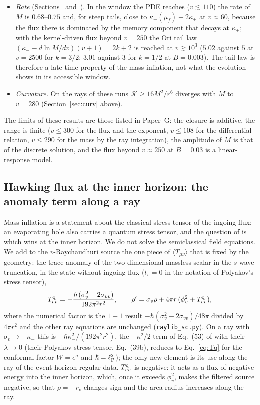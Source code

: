 \documentclass[11pt]{article}
\begin{document}
\begin{itemize}
\item \emph{Rate} (Sections~\Gkernelnum{} and~\Grayn{}). In the window the PDE reaches ($v\lesssim110$) the rate of $M$ is $0.68$--$0.75$ and, for steep tails, close to $\kappa_-(\mu_f)-2\kappa_+$ at $v\approx60$, because the flux there is dominated by the memory component that decays at $\kappa_+$; with the kernel-driven flux beyond $v=250$ the Ori tail law $(\kappa_--d\ln M/dv)(v+1)=2k+2$ is reached at $v\gtrsim10^{3}$ ($5.02$ against $5$ at $v=2500$ for $k=3/2$; $3.01$ against $3$ for $k=1/2$ at $B=0.003$). The tail law is therefore a late-time property of the mass inflation, not what the evolution shows in its accessible window.
\item \emph{Curvature.} On the rays of these runs $\mathcal K\ge16M^2/r^6$ diverges with $M$ to $v=280$ (Section~\ref{sec:curv} above).
\end{itemize}
The limits of these results are those listed in Paper~G: the closure is additive, the range is finite ($v\le300$ for the flux and the exponent, $v\le108$ for the differential relation, $v\le290$ for the mass by the ray integration), the amplitude of $M$ is that of the discrete solution, and the flux beyond $v\approx250$ at $B=0.03$ is a linear-response model.


\subsection{Hawking flux at the inner horizon: the anomaly term along a ray}
\label{sec:semiclassical}

Mass inflation is a statement about the classical stress tensor of the ingoing flux; an evaporating hole also carries a quantum stress tensor, and the question of \citet{Barcelo2022} is which wins at the inner horizon. We do not solve the semiclassical field equations. We add to the $v$-Raychaudhuri source the one piece of $\langle T_{\mu\nu}\rangle$ that is fixed by the geometry: the trace anomaly of the two-dimensional massless scalar in the $s$-wave truncation, in the state without ingoing flux ($t_v=0$ in the notation of Polyakov's stress tensor),
\begin{equation}
T^{\rm q}_{vv}=-\frac{\hbar\,(\sigma_v^2-2\sigma_{vv})}{192\pi^{2}r^{2}},\qquad
\rho'=\sigma_v\rho+4\pi r\,(\phi_v^2+T^{\rm q}_{vv}),
\label{eq:Tq}
\end{equation}
where the numerical factor is the $1{+}1$ result $-\hbar(\sigma_v^2-2\sigma_{vv})/48\pi$ divided by $4\pi r^2$ and the other ray equations are unchanged (\texttt{raylib\_sc.py}). On a ray with $\sigma_v\to-\kappa_-$ this is $-\hbar\kappa_-^2/(192\pi^2r^2)$, the $-\kappa^2/2$ term of Eq.~(53) of \citet{Barcelo2022} with their $\lambda\to0$ (their Polyakov stress tensor, Eq.~(39b), reduces to Eq.~\eqref{eq:Tq} for the conformal factor $W=e^\sigma$ and $\hbar=\ell_{\rm P}^2$); the only new element is its use along the ray of the event-horizon-regular data. $T^{\rm q}_{vv}$ is negative: it acts as a flux of negative energy into the inner horizon, which, once it exceeds $\phi_v^2$, makes the filtered source negative, so that $\rho=-r_v$ changes sign and the area radius increases along the ray.
\end{document}
